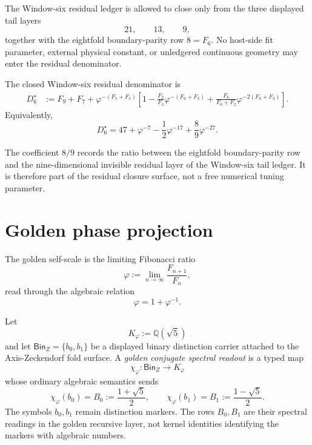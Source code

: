 \begin{principle}
\label{prin:zeckendorf-window-six-residual-closure}
The Window-six residual ledger is allowed to close only from the three
displayed tail layers
$$
  21,\qquad 13,\qquad 9,
$$
together with the eightfold boundary-parity row \(8=F_6\). No host-side
fit parameter, external physical constant, or unledgered continuous
geometry may enter the residual denominator.
\end{principle}

\begin{definition}
\label{def:zeckendorf-window-six-closed-residual-denominator}
The closed Window-six residual denominator is
$$
\begin{aligned}
  D_6^\star
  &:=
  F_9+F_7
  +
  \varphi^{-(F_5+F_3)}
  \left[
    1
    -
    \frac{F_2}{F_3}\varphi^{-(F_6+F_3)}
    +
    \frac{F_6}{F_6+F_2}\varphi^{-2(F_6+F_3)}
  \right].
\end{aligned}
$$
Equivalently,
$$
  D_6^\star
  =
  47+\varphi^{-7}-\frac12\varphi^{-17}+\frac89\varphi^{-27}.
$$
\end{definition}

\begin{remark}
\label{rem:zeckendorf-eight-nine-closure-coefficient}
The coefficient \(8/9\) records the ratio between the eightfold
boundary-parity row and the nine-dimensional invisible residual layer of
the Window-six tail ledger. It is therefore part of the residual closure
surface, not a free numerical tuning parameter.
\end{remark}

\section{Golden phase projection}

\begin{definition}
\label{def:zeckendorf-golden-self-scale}
The golden self-scale is the limiting Fibonacci ratio
$$
  \varphi
  :=
  \lim_{n\to\infty}\frac{F_{n+1}}{F_n},
$$
read through the algebraic relation
$$
  \varphi=1+\varphi^{-1}.
$$
\end{definition}

\begin{definition}
\label{def:zeckendorf-golden-conjugate-spectral-readout}
Let
$$
K_{\varphi}:=\mathbb Q(\sqrt5)
$$
and let $\mathsf{Bin}_{Z}=\{b_0,b_1\}$ be a displayed binary
distinction carrier attached to the Axis-Zeckendorf fold surface. A
\emph{golden conjugate spectral readout} is a typed map
$$
\chi_{\varphi}:\mathsf{Bin}_{Z}\to K_{\varphi}
$$
whose ordinary algebraic semantics sends
$$
\chi_{\varphi}(b_0)=B_0:=\frac{1+\sqrt5}{2},
\qquad
\chi_{\varphi}(b_1)=B_1:=\frac{1-\sqrt5}{2}.
$$
The symbols $b_0,b_1$ remain distinction markers. The rows
$B_0,B_1$ are their spectral readings in the golden recursive layer, not
kernel identities identifying the markers with algebraic numbers.
\end{definition}

